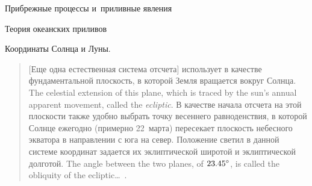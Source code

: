 \begin{chapter}{Прибрежные процессы и~приливные явления}
\begin{section}{Теория океанских приливов}
\begin{paragraph}{Координаты Солнца и Луны.}
\begin{quotation}
[Еще одна естественная система отсчета] использует в качестве фундаментальной
плоскость, в которой Земля вращается вокруг Солнца.
The celestial extension of this plane,  
which is traced by the sun's annual apparent movement, 
called the \textit{ecliptic}. 
В качестве начала отсчета на этой плоскости также удобно выбрать точку
весеннего равноденствия, в которой Солнце ежегодно (примерно 22~марта) 
пересекает плоскость небесного экватора в направлении с юга на север.
Положение светил в данной системе координат задается их эклиптической
широтой и эклиптической долготой. The angle between the two planes, of
${23.45}^\circ$, is called the obliquity of the ecliptic\dots{}~\cite[стр.~72]{Pugh:1987}.
%
\end{quotation}
\end{paragraph}


\end{section}
\end{chapter}

